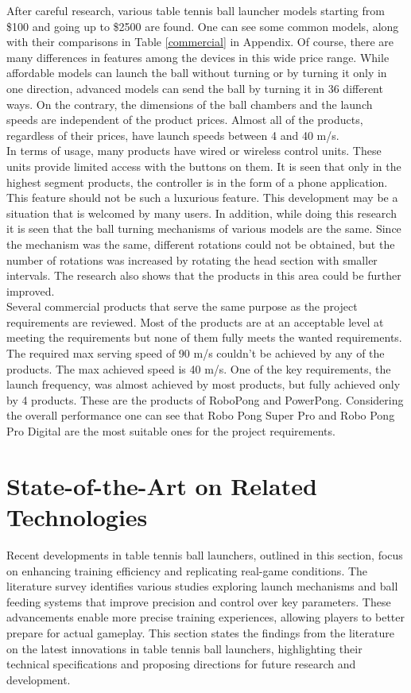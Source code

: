 \documentclass[12pt]{report}
\begin{document}
After careful research, various table tennis ball launcher models starting from \$100 and going up to \$2500 are found. One can see some common models, along with their comparisons in Table \ref{commercial} in Appendix. Of course, there are many differences in features among the devices in this wide price range. While affordable models can launch the ball without turning or by turning it only in one direction, advanced models can send the ball by turning it in 36 different ways. On the contrary, the dimensions of the ball chambers and the launch speeds are independent of the product prices. Almost all of the products, regardless of their prices, have launch speeds between 4 and 40 m/s. \\

In terms of usage, many products have wired or wireless control units. These units provide limited access with the buttons on them. It is seen that only in the highest segment products, the controller is in the form of a phone application. This feature should not be such a luxurious feature. This development may be a situation that is welcomed by many users. In addition, while doing this research it is seen that the ball turning mechanisms of various models are the same. Since the mechanism was the same, different rotations could not be obtained, but the number of rotations was increased by rotating the head section with smaller intervals. The research also shows that the products in this area could be further improved. \\

Several commercial products that serve the same purpose as the project requirements are reviewed. Most of the products are at an acceptable level at meeting the requirements but none of them fully meets the wanted requirements. The required max serving speed of 90 m/s couldn’t be achieved by any of the products. The max achieved speed is 40 m/s. One of the key requirements, the launch frequency, was almost achieved by most products, but fully achieved only by 4 products. These are the products of RoboPong and PowerPong. Considering the overall performance one can see that Robo Pong Super Pro and Robo Pong Pro Digital are the most suitable ones for the project requirements.

\section{State-of-the-Art on Related Technologies}

Recent developments in table tennis ball launchers, outlined in this section, focus on enhancing training efficiency and replicating real-game conditions. The literature survey identifies various studies exploring launch mechanisms and ball feeding systems that improve precision and control over key parameters. These advancements enable more precise training experiences, allowing players to better prepare for actual gameplay. This section states the findings from the literature on the latest innovations in table tennis ball launchers, highlighting their technical specifications and proposing directions for future research and development. 
\end{document}
